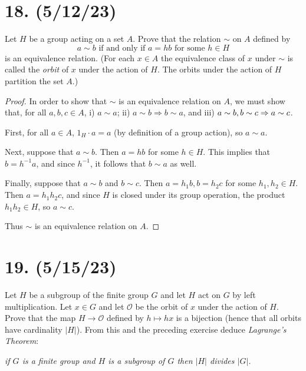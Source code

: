 \documentclass{article}
\begin{document}
\section*{18. (5/12/23)}

Let $H$ be a group acting on a set $A$. Prove that the relation $\sim$ on $A$ defined by
\begin{equation*}
  a \sim b \text{ if and only if } a = hb \text{ for some } h \in H
\end{equation*}
is an equivalence relation. (For each $x \in A$ the equivalence class of $x$ under $\sim$ is called the \emph{orbit} of $x$ under the action of $H$. The orbits under the action of $H$ partition the set $A$.)

\begin{proof}
  In order to show that $\sim$ is an equivalence relation on $A$, we must show that, for all $a, b, c \in A$, i) $a \sim a$; ii) $a \sim b \Rightarrow b \sim a$, and iii) $a \sim b, b \sim c \Rightarrow \\ a \sim c$.

  First, for all $a \in A$, $1_H \cdot a = a$ (by definition of a group action), so $a \sim a$.

  Next, suppose that $a \sim b$. Then $a = hb$ for some $h \in H$. This implies that $b = h^{-1} a$, and since $h^{-1}$, it follows that $b \sim a$ as well.

  Finally, suppose that $a \sim b$ and $b \sim c$. Then $a = h_1 b, b = h_2 c$ for some $h_1, h_2 \in H$. Then $a = h_1 h_2 c$, and since $H$ is closed under its group operation, the product $h_1 h_2 \in H$, so $a \sim c$.

  Thus $\sim$ is an equivalence relation on $A$.
\end{proof}

\section*{19. (5/15/23)}

Let $H$ be a subgroup of the finite group $G$ and let $H$ act on $G$ by left multiplication. Let $x \in G$ and let $\mathcal{O}$ be the orbit of $x$ under the action of $H$. Prove that the map $H \rightarrow \mathcal{O}$ defined by $h \mapsto hx$ is a bijection (hence that all orbits have cardinality $|H|$). From this and the preceding exercise deduce \emph{Lagrange's Theorem}:
\begin{center}
  \emph{if $G$ is a finite group and $H$ is a subgroup of $G$ then $|H|$ divides $|G|$.}
\end{center}
\end{document}
